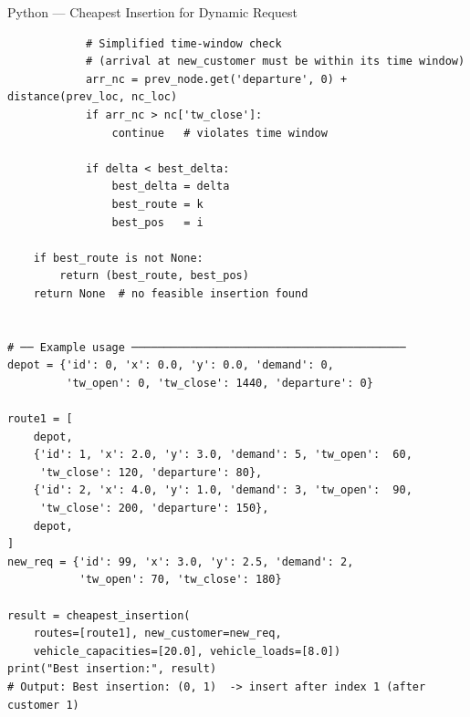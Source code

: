 \documentclass[aspectratio=169,10pt]{beamer}
\begin{document}
\begin{frame}[fragile]{Python — Cheapest Insertion for Dynamic Request}
\begin{lstlisting}
            # Simplified time-window check
            # (arrival at new_customer must be within its time window)
            arr_nc = prev_node.get('departure', 0) + distance(prev_loc, nc_loc)
            if arr_nc > nc['tw_close']:
                continue   # violates time window

            if delta < best_delta:
                best_delta = delta
                best_route = k
                best_pos   = i

    if best_route is not None:
        return (best_route, best_pos)
    return None  # no feasible insertion found


# ── Example usage ──────────────────────────────────────────
depot = {'id': 0, 'x': 0.0, 'y': 0.0, 'demand': 0,
         'tw_open': 0, 'tw_close': 1440, 'departure': 0}

route1 = [
    depot,
    {'id': 1, 'x': 2.0, 'y': 3.0, 'demand': 5, 'tw_open':  60,
     'tw_close': 120, 'departure': 80},
    {'id': 2, 'x': 4.0, 'y': 1.0, 'demand': 3, 'tw_open':  90,
     'tw_close': 200, 'departure': 150},
    depot,
]
new_req = {'id': 99, 'x': 3.0, 'y': 2.5, 'demand': 2,
           'tw_open': 70, 'tw_close': 180}

result = cheapest_insertion(
    routes=[route1], new_customer=new_req,
    vehicle_capacities=[20.0], vehicle_loads=[8.0])
print("Best insertion:", result)
# Output: Best insertion: (0, 1)  -> insert after index 1 (after customer 1)
\end{lstlisting}

\end{frame}
\end{document}

